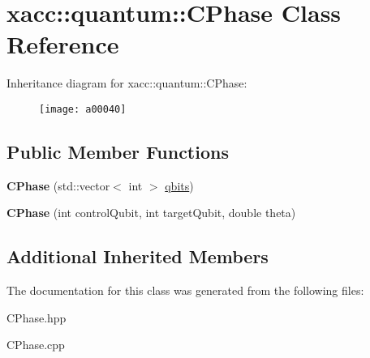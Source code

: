 \hypertarget{a00040}{}\section{xacc\+:\+:quantum\+:\+:C\+Phase Class Reference}
\label{a00040}
Inheritance diagram for xacc\+:\+:quantum\+:\+:C\+Phase\+:\begin{figure}[H]
\begin{center}
\leavevmode
\texttt{[image: a00040]}
\end{center}
\end{figure}
\subsection*{Public Member Functions}
\begin{DoxyCompactItemize}
\item 
{\bfseries C\+Phase} (std\+::vector$<$ int $>$ \hyperlink{a00062_a2a56be6c2519ea65df4d06f4abae1393}{qbits})\hypertarget{a00040_a5899f838bc4b892d179f51fcf0ac4cc8}{}\label{a00040_a5899f838bc4b892d179f51fcf0ac4cc8}

\item 
{\bfseries C\+Phase} (int control\+Qubit, int target\+Qubit, double theta)\hypertarget{a00040_af642f499455f0065279a1e1d178c818f}{}\label{a00040_af642f499455f0065279a1e1d178c818f}

\end{DoxyCompactItemize}
\subsection*{Additional Inherited Members}


The documentation for this class was generated from the following files\+:\begin{DoxyCompactItemize}
\item 
C\+Phase.\+hpp\item 
C\+Phase.\+cpp\end{DoxyCompactItemize}
